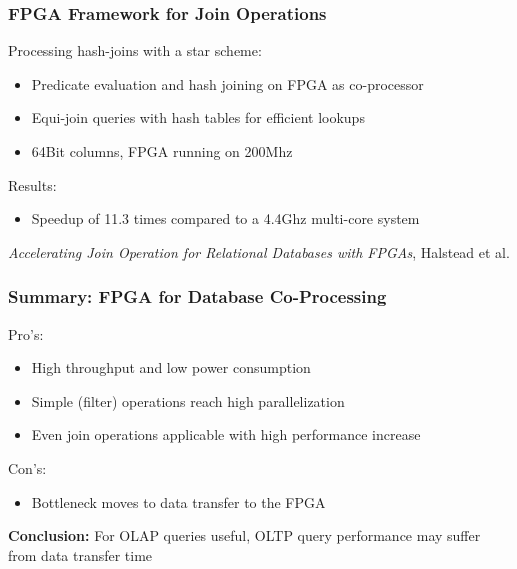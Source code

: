 \documentclass{beamer}
\begin{document}

\begin{frame}
	\frametitle{FPGA Framework for Join Operations}
	Processing hash-joins with a star scheme:
	\begin{itemize}
		\item Predicate evaluation and hash joining on FPGA as co-processor
		\item Equi-join queries with hash tables for efficient lookups
		\item 64Bit columns, FPGA running on 200Mhz 
	\end{itemize}
	Results:
	\begin{itemize}
		\item Speedup of 11.3 times compared to a 4.4Ghz multi-core system
	\end{itemize}
	\begin{center}
		\small \emph{Accelerating Join Operation for Relational Databases with FPGAs}, Halstead et al.
	\end{center}
\end{frame}

\begin{frame}
\frametitle{Summary: FPGA for Database Co-Processing}
Pro's:
\begin{itemize}
	\item High throughput and low power consumption
	\item Simple (filter) operations reach high parallelization
	\item Even join operations applicable with high performance increase
\end{itemize}
\vspace*{0.3cm}
Con's:
\begin{itemize}
	\item Bottleneck moves to data transfer to the FPGA
\end{itemize}
\vspace*{0.3cm}
\textbf{Conclusion:} For OLAP queries useful, OLTP query performance may suffer from data transfer time

\end{frame}
\end{document}

